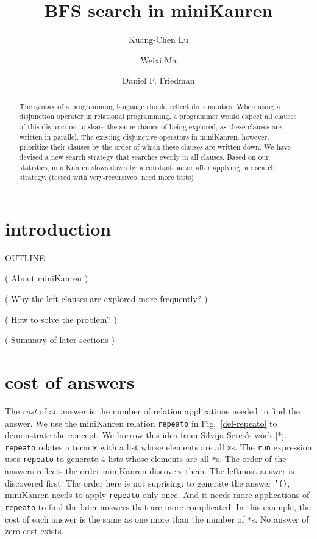 \documentclass[format=acmlarge, review=true, authordraft=true]{acmart}
\title{BFS search in miniKanren}
\author{Kuang-Chen Lu}
\affiliation{Indiana University}
\author{Weixi Ma}
\affiliation{Indiana University}
\author{Daniel P. Friedman}
\affiliation{Indiana University}
\begin{document}
\begin{abstract}

The syntax of a programming language should reflect its semantics.
When using a disjunction operator in relational programming, a programmer would
expect all clauses of this disjunction to share the same chance of being explored,
as these clauses are written in parallel. The existing disjunctive operators in miniKanren,
however, prioritize their clauses by the order of which these clauses are written down.
We have devised a new search strategy that searches evenly in all clauses.
Based on our statistics, miniKanren slows down by a constant factor after applying our search strategy.
(tested with very-recursiveo, need more tests)


\end{abstract}

\maketitle

\section{introduction}

OUTLINE:

( About miniKanren )

( Why the left clauses are explored more frequently? )


( How to solve the problem? )

( Summary of later sections )

\section{cost of answers}


The \emph{cost} of an answer is the number of relation applications needed to find the answer. We use the miniKanren relation \texttt{repeato} in Fig.~\ref{def-repeato} to demonstrate the concept. We borrow this idea from Silvija Seres's work [*]. \texttt{repeato} relates a term \texttt{x} with a list whose elements are all \texttt{x}s. The \texttt{run} expression uses \texttt{repeato} to generate 4 lists whose elements are all \texttt{*}s. The order of the answers reflects the order miniKanren discovers them. The leftmost answer is discovered first. The order here is not suprising: to generate the answer \texttt{'()}, miniKanren needs to apply \texttt{repeato} only once. And it needs more applications of \texttt{repeato} to find the later answers that are more complicated. In this example, the cost of each answer is the same as one more than the number of \texttt{*}s. No answer of zero cost exists.
\end{document}
